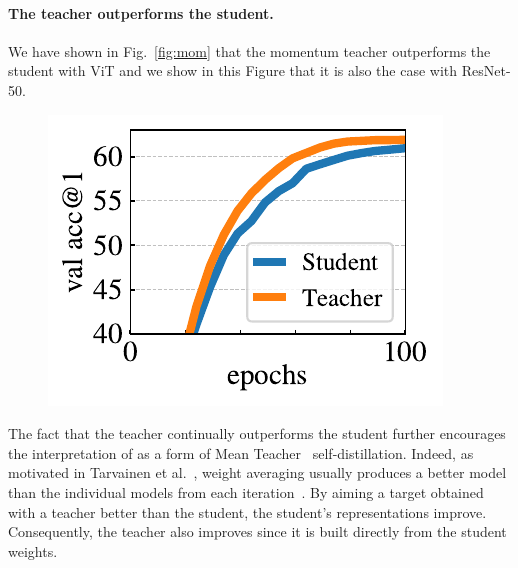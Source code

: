 \paragraph{The teacher outperforms the student.}
We have shown in Fig.~\ref{fig:mom} that the momentum teacher outperforms the student with ViT and we show in this Figure that it is also the case with ResNet-50.
\begin{figure}[h!]
\vspace{-0.8em}
\centering
\includegraphics[width=0.48\linewidth]{figure_mom_rn50.pdf}
\vspace{-0.8em}
\end{figure}
The fact that the teacher continually outperforms the student further encourages the interpretation of \OURS as a form of Mean Teacher~\cite{tarvainen2017mean} self-distillation.
Indeed, as motivated in Tarvainen et al.~\cite{tarvainen2017mean}, weight averaging usually produces a better model than the individual models from each iteration~\cite{polyak1992acceleration}.
By aiming a target obtained with a teacher better than the student, the student's representations improve.
Consequently, the teacher also improves since it is built directly from the student weights.

